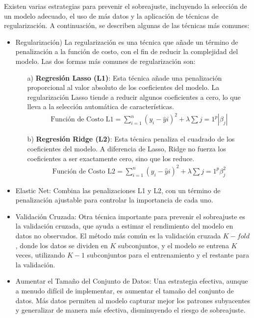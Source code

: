 \documentclass[a4paper]{report} %
\begin{document}
Existen varias estrategias para prevenir el sobreajuste, incluyendo la selección de un modelo adecuado, el uso de más datos y la aplicación de técnicas de regularización. A continuación, se describen algunas de las técnicas más comunes:

\begin{itemize}

\item Regularizaci\'on) La regularización es una técnica que añade un término de penalización a la función de costo, con el fin de reducir la complejidad del modelo. Las dos formas más comunes de regularización son:

\begin{itemize} 
\item[a) ] \textbf{Regresión Lasso (L1)}: Esta técnica añade una penalización proporcional al valor absoluto de los coeficientes del modelo. La regularización Lasso tiende a reducir algunos coeficientes a cero, lo que lleva a la selección automática de características. \begin{eqnarray*} 
\text{Función de Costo L1} = \sum_{i=1}^{n} (y_i - \hat{y}i)^2 + \lambda \sum{j=1}^{p} |\beta_j| 
\end{eqnarray*} 

\item[b) ] \textbf{Regresión Ridge (L2)}: Esta técnica penaliza el cuadrado de los coeficientes del modelo. A diferencia de Lasso, Ridge no fuerza los coeficientes a ser exactamente cero, sino que los reduce. 
\begin{eqnarray*} 
\text{Función de Costo L2} = \sum_{i=1}^{n} (y_i - \hat{y}i)^2 + \lambda \sum{j=1}^{p} \beta_j^2 
\end{eqnarray*} 
\end{itemize}

\item Elastic Net: Combina las penalizaciones L1 y L2, con un término de penalización ajustable para controlar la importancia de cada uno. 

\item Validación Cruzada: Otra técnica importante para prevenir el sobreajuste es la validación cruzada, que ayuda a estimar el rendimiento del modelo en datos no observados. El método más común es la validación cruzada $K-fold$, donde los datos se dividen en $K$ subconjuntos, y el modelo se entrena $K$ veces, utilizando $K-1$ subconjuntos para el entrenamiento y el restante para la validación.

\item Aumentar el Tamaño del Conjunto de Datos: Una estrategia efectiva, aunque a menudo difícil de implementar, es aumentar el tamaño del conjunto de datos. Más datos permiten al modelo capturar mejor los patrones subyacentes y generalizar de manera más efectiva, disminuyendo el riesgo de sobreajuste.


\end{itemize}
\end{document}
